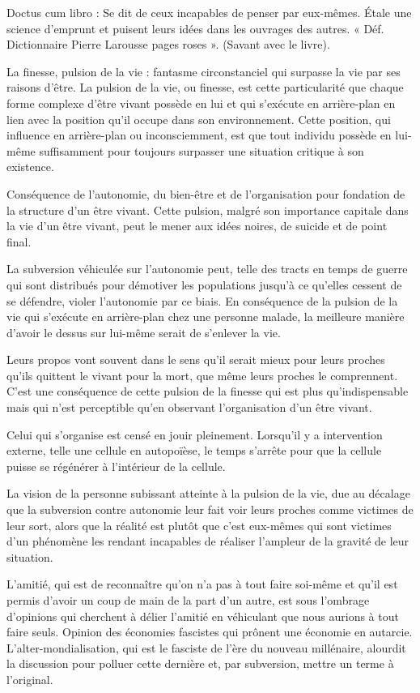 \documentclass[12pt,oneside]{article}
\begin{document}
Doctus cum libro : Se dit de ceux incapables de penser par eux-mêmes. Étale une science d'emprunt et puisent leurs idées dans les ouvrages des autres. « Déf. Dictionnaire Pierre Larousse pages roses ». (Savant avec le livre).

La finesse, pulsion de la vie : fantasme circonstanciel qui surpasse la vie par ses raisons d'être. La pulsion de la vie, ou finesse, est cette particularité que chaque forme complexe d'être vivant possède en lui et qui s'exécute en arrière-plan en lien avec la position qu'il occupe dans son environnement. Cette position, qui influence en arrière-plan ou inconsciemment, est que tout individu possède en lui-même suffisamment pour toujours surpasser une situation critique à son existence.

Conséquence de l'autonomie, du bien-être et de l'organisation pour fondation de la structure d'un être vivant. Cette pulsion, malgré son importance capitale dans la vie d'un être vivant, peut le mener aux idées noires, de suicide et de point final.

La subversion véhiculée sur l'autonomie peut, telle des tracts en temps de guerre qui sont distribués pour démotiver les populations jusqu'à ce qu'elles cessent de se défendre, violer l'autonomie par ce biais. En conséquence de la pulsion de la vie qui s'exécute en arrière-plan chez une personne malade, la meilleure manière d'avoir le dessus sur lui-même serait de s'enlever la vie.

Leurs propos vont souvent dans le sens qu'il serait mieux pour leurs proches qu'ils quittent le vivant pour la mort, que même leurs proches le comprennent. C'est une conséquence de cette pulsion de la finesse qui est plus qu'indispensable mais qui n'est perceptible qu'en observant l'organisation d'un être vivant.

Celui qui s'organise est censé en jouir pleinement. Lorsqu'il y a intervention externe, telle une cellule en autopoïèse, le temps s'arrête pour que la cellule puisse se régénérer à l'intérieur de la cellule.

La vision de la personne subissant atteinte à la pulsion de la vie, due au décalage que la subversion contre autonomie leur fait voir leurs proches comme victimes de leur sort, alors que la réalité est plutôt que c'est eux-mêmes qui sont victimes d'un phénomène les rendant incapables de réaliser l'ampleur de la gravité de leur situation.

L'amitié, qui est de reconnaître qu'on n'a pas à tout faire soi-même et qu'il est permis d'avoir un coup de main de la part d'un autre, est sous l'ombrage d'opinions qui cherchent à délier l'amitié en véhiculant que nous aurions à tout faire seuls. Opinion des économies fascistes qui prônent une économie en autarcie. L'alter-mondialisation, qui est le fasciste de l'ère du nouveau millénaire, alourdit la discussion pour polluer cette dernière et, par subversion, mettre un terme à l'original.
\end{document}
